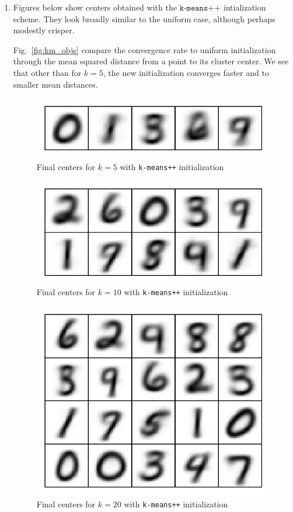 \documentclass[11pt,letterpaper]{article}
\theoremstyle{definition}
\theoremstyle{plain}
\numberwithin{equation}{section}
\numberwithin{figure}{section}
\begin{document}
\begin{enumerate}
\begin{enumerate}
		\item Figures below show centers obtained with the $\texttt{k-means++}$ intialization scheme. They look broadly similar to the uniform case, although perhaps modestly crisper. 

		Fig.~\ref{fig:km_objs} compare the convergence rate to uniform initialization through the mean squared distance from a point to its cluster center. We see that other than for $k=5$, the new initialization converges faster and to smaller mean distances.

		\begin{figure}[H]
			\centering
			\includegraphics[width=.5\textwidth]{figures/5pp-centers.pdf}
			\caption{Final centers for $k=5$ with \texttt{k-means++} initialization}
		\end{figure}

		\begin{figure}[H]
			\centering
			\includegraphics[width=.5\textwidth]{figures/10pp-centers.pdf}
			\caption{Final centers for $k=10$ with \texttt{k-means++} initialization}
		\end{figure}

		\begin{figure}[H]
			\centering
			\includegraphics[width=.5\textwidth]{figures/20pp-centers.pdf}
			\caption{Final centers for $k=20$ with \texttt{k-means++} initialization}
		\end{figure}



\end{enumerate}
\end{enumerate}
\end{document}
